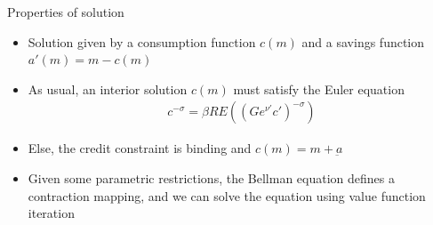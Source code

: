 \documentclass[9pt]{beamer}
\newcommand{\bit}{\begin{itemize}}
\newcommand{\eit}{\end{itemize}}
\newcommand{\bc}{\color{blue}}
\begin{document}
\begin{frame}{Properties of solution}

\bit
\setlength\itemsep{1.5em}

\item Solution given by a consumption function $c(m)$ and a savings function $a'(m)=m-c(m)$

\item As usual, an interior solution $c(m)$ must satisfy the Euler equation
\begin{align*}
c^{-\sigma} = \beta R E \left(\left(Ge^{\nu'}c'\right)^{-\sigma}\right)
\end{align*}

\item Else, the credit constraint is binding and $c(m)=m+\underbar a$

\item Given some parametric restrictions, the Bellman equation defines a contraction mapping, and we can solve the equation using value function iteration


%	
\eit


\end{frame}

%
%
%
%
%
\end{document}
